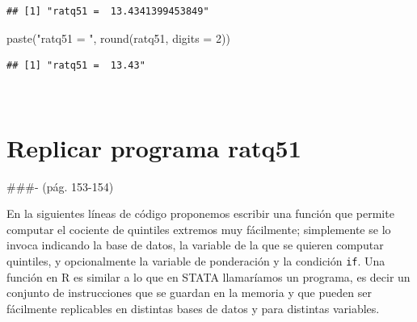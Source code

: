 \documentclass[
]{book}
\newenvironment{Shaded}{\begin{snugshade}}{\end{snugshade}}
\newcommand{\AttributeTok}[1]{\textcolor[rgb]{0.77,0.63,0.00}{#1}}
\newcommand{\ConstantTok}[1]{\textcolor[rgb]{0.00,0.00,0.00}{#1}}
\newcommand{\DecValTok}[1]{\textcolor[rgb]{0.00,0.00,0.81}{#1}}
\newcommand{\FunctionTok}[1]{\textcolor[rgb]{0.00,0.00,0.00}{#1}}
\newcommand{\NormalTok}[1]{#1}
\newcommand{\OtherTok}[1]{\textcolor[rgb]{0.56,0.35,0.01}{#1}}
\newcommand{\SpecialCharTok}[1]{\textcolor[rgb]{0.00,0.00,0.00}{#1}}
\newcommand{\StringTok}[1]{\textcolor[rgb]{0.31,0.60,0.02}{#1}}
\begin{document}
\begin{Shaded}
\end{Shaded}

\begin{verbatim}
## [1] "ratq51 =  13.4341399453849"
\end{verbatim}

\begin{Shaded}
\begin{Highlighting}[]
\FunctionTok{paste}\NormalTok{(}\StringTok{"ratq51 = "}\NormalTok{, }\FunctionTok{round}\NormalTok{(ratq51, }\AttributeTok{digits =} \DecValTok{2}\NormalTok{))}
\end{Highlighting}
\end{Shaded}

\begin{verbatim}
## [1] "ratq51 =  13.43"
\end{verbatim}

~

\hypertarget{replicar-programa-ratq51}{%
\section{Replicar programa ratq51}\label{replicar-programa-ratq51}}

\#\#\#- (pág. 153-154)

En la siguientes líneas de código proponemos escribir una función que permite computar el cociente de quintiles extremos muy fácilmente; simplemente se lo invoca indicando la base de datos, la variable de la que se quieren computar quintiles, y opcionalmente la variable de ponderación y la condición \texttt{if}. Una función en R es similar a lo que en STATA llamaríamos un programa, es decir un conjunto de instrucciones que se guardan en la memoria y que pueden ser fácilmente replicables en distintas bases de datos y para distintas variables.
\end{document}

